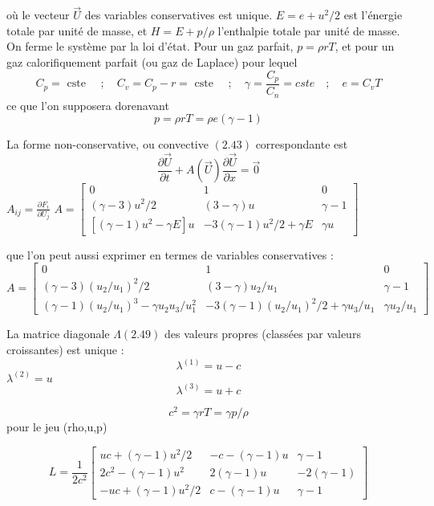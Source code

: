 où le vecteur $\vec{U}$ des variables conservatives est unique. $E=e+u^{2} / 2$ est l'énergie totale par unité de masse, et $H=E+p / \rho$ l'enthalpie totale par unité de masse. On ferme le système par la loi d'état. Pour un gaz parfait, $p=\rho r T$, et pour un gaz calorifiquement parfait (ou gaz de Laplace) pour lequel
\begin{equation}
C_{p}=\text { cste } \quad ; \quad C_{v}=C_{p}-r=\text { cste } \quad ; \quad \gamma=\frac{C_{p}}{C_{n}}=c s t e \quad ; \quad e=C_{v} T
\end{equation}
ce que l'on supposera dorenavant
\begin{equation}
p=\rho r T=\rho e(\gamma-1)
\end{equation}

La forme non-conservative, ou convective $(2.43)$ correspondante est
$$
\frac{\partial \vec{U}}{\partial t}+A(\vec{U}) \frac{\partial \vec{U}}{\partial x}=\overrightarrow{0}
$$
$A_{i j}=\frac{\partial F_{i}}{\partial U_{j}}$
$A=\left[\begin{array}{ccc}
0 & 1 & 0 \\
(\gamma-3) u^{2} / 2 & (3-\gamma) u & \gamma-1 \\
{\left[(\gamma-1) u^{2}-\gamma E\right] u} & -3(\gamma-1) u^{2} / 2+\gamma E & \gamma u
\end{array}\right]$

que l'on peut aussi exprimer en termes de variables conservatives :
$$
A=\left[\begin{array}{ccc}
0 & 1 & 0 \\
(\gamma-3)\left(u_{2} / u_{1}\right)^{2} / 2 & (3-\gamma) u_{2} / u_{1} & \gamma-1 \\
(\gamma-1)\left(u_{2} / u_{1}\right)^{3}-\gamma u_{2} u_{3} / u_{1}^{2} & -3(\gamma-1)\left(u_{2} / u_{1}\right)^{2} / 2+\gamma u_{3} / u_{1} & \gamma u_{2} / u_{1}
\end{array}\right]
$$

La matrice diagonale $\Lambda(2.49)$ des valeurs propres (classées par valeurs croissantes) est unique :
$$
\lambda^{(1)}=u-c
$$
$\lambda^{(2)}=u$
$$
\lambda^{(3)}=u+c
$$

$$c^{2}=\gamma r T=\gamma p / \rho$$
 pour le jeu (rho,u,p)

\begin{equation}
L=\frac{1}{2 c^{2}}\left[\begin{array}{rrr}
u c+(\gamma-1) u^{2} / 2 & -c-(\gamma-1) u & \gamma-1 \\
2 c^{2}-(\gamma-1) u^{2} & 2(\gamma-1) u & -2(\gamma-1) \\
-u c+(\gamma-1) u^{2} / 2 & c-(\gamma-1) u & \gamma-1
\end{array}\right]
\end{equation}

